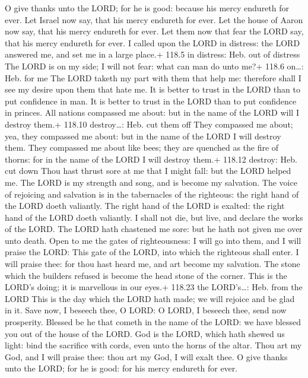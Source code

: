  O give thanks unto the LORD; for he is good: because his
mercy endureth for ever.  Let Israel now say, that his mercy
endureth for ever.  Let the house of Aaron now say, that his
mercy endureth for ever.  Let them now that fear the LORD
say, that his mercy endureth for ever.  I called upon the
LORD in distress: the LORD answered me, and set me in a large place.+
118.5 in distress: Heb. out of distress  The LORD is on my
side; I will not fear: what can man do unto me?+ 118.6 on\ldots: Heb.
for me  The LORD taketh my part with them that help me:
therefore shall I see my desire upon them that hate me.  It
is better to trust in the LORD than to put confidence in man.
 It is better to trust in the LORD than to put confidence in
princes.  All nations compassed me about: but in the name
of the LORD will I destroy them.+ 118.10 destroy\ldots: Heb. cut them
off  They compassed me about; yea, they compassed me about:
but in the name of the LORD I will destroy them.  They
compassed me about like bees; they are quenched as the fire of thorns:
for in the name of the LORD I will destroy them.+ 118.12 destroy: Heb.
cut down  Thou hast thrust sore at me that I might fall:
but the LORD helped me.  The LORD is my strength and song,
and is become my salvation.  The voice of rejoicing and
salvation is in the tabernacles of the righteous: the right hand of the
LORD doeth valiantly.  The right hand of the LORD is
exalted: the right hand of the LORD doeth valiantly.  I
shall not die, but live, and declare the works of the LORD.
 The LORD hath chastened me sore: but he hath not given me
over unto death.  Open to me the gates of righteousness: I
will go into them, and I will praise the LORD:  This gate
of the LORD, into which the righteous shall enter.  I will
praise thee: for thou hast heard me, and art become my salvation.
 The stone which the builders refused is become the head
stone of the corner.  This is the LORD's doing; it is
marvellous in our eyes.+ 118.23 the LORD's\ldots: Heb. from the LORD
 This is the day which the LORD hath made; we will rejoice
and be glad in it.  Save now, I beseech thee, O LORD: O
LORD, I beseech thee, send now prosperity.  Blessed be he
that cometh in the name of the LORD: we have blessed you out of the
house of the LORD.  God is the LORD, which hath shewed us
light: bind the sacrifice with cords, even unto the horns of the altar.
 Thou art my God, and I will praise thee: thou art my God,
I will exalt thee.  O give thanks unto the LORD; for he is
good: for his mercy endureth for ever.

